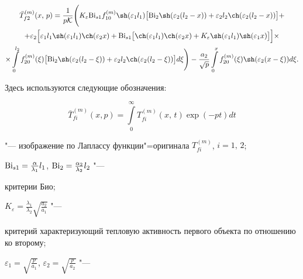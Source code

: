 \begin{multline}

 \label{evdok:eq9}

\bar {T}_{f2}^{(m)} (x,\,p) =

\frac{1}{p\mathcal{K}}\Bigg(

K_\varepsilon {\rm Bi}_{s1} f_{10}^{(m)} 

\sh(\varepsilon _1 l_1) \big[ {\rm Bi}_2 \sh(\varepsilon _2 (l_2 - x)) + \varepsilon 

_2 l_2 \ch(\varepsilon _2 (l_2 - x) )\big] + \\

+\varepsilon _2\Big[ \varepsilon _1 l_1 

\sh(\varepsilon _1 l_1 )\ch(\varepsilon _2 x) + {\rm Bi}_{s1} \big[\ch(\varepsilon _1 l_1 )\ch(\varepsilon _2 x) + K_\varepsilon \sh(\varepsilon _1 l_1) \sh(\varepsilon _1 x)\big]\Big] \times

\\

\times

\int

\limits_0^{l_2 } f_{20}^{(m)} (\xi) \big[ {\rm Bi}_2 

\sh(\varepsilon _2 (l_2 - \xi )) + \varepsilon _2 l_2 \ch(\varepsilon _2 (l_2 - 

\xi )) \big]d\xi \Bigg) - 

\frac{a_2 }{\sqrt p }\int\limits_0^x {f_{20}^{(m)} (\xi )} \sh(\varepsilon _2 (x - \xi ))d\xi .

\end{multline}

Здесь используются следующие обозначения:

$$\bar {T}_{fi}^{(m)} (x,p) = \int\limits_0^\infty T_{fi}^{(m)} (x,\,t)\exp(- pt)dt $$ 

"--- изображение по Лаплассу функции"=оригинала $T_{fi}^{(m)}$, $i=1,\,2$;

$

{\rm Bi}_{s1} = \frac{\alpha }{\lambda _1 }l_1$, ${\rm Bi}_2 = \frac{\alpha _2 }{\lambda _2 }l_2$ "---

критерии Био; 

$K_\varepsilon = \frac{\lambda _1 }{\lambda _2 }\sqrt {\frac{a_2 }{a_1 }}$ "--- 

критерий характеризующий тепловую активность первого объекта по отношению ко второму; 

$ \varepsilon _1 = \sqrt {\frac{p}{a_1 }}$, $\varepsilon _2 = \sqrt {\frac{p}{a_2 }}$ "---

